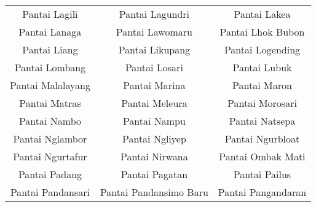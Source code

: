 \begin{table}[H]
\begin{tabular}{ c | c | c}
Pantai Lagili & Pantai Lagundri & Pantai Lakea\\
Pantai Lanaga & Pantai Lawomaru & Pantai Lhok Bubon\\
Pantai Liang & Pantai Likupang & Pantai Logending\\
Pantai Lombang & Pantai Losari & Pantai Lubuk\\
Pantai Malalayang & Pantai Marina & Pantai Maron\\
Pantai Matras & Pantai Meleura & Pantai Morosari\\
Pantai Nambo & Pantai Nampu & Pantai Natsepa\\
Pantai Nglambor & Pantai Ngliyep & Pantai Ngurbloat\\
Pantai Ngurtafur & Pantai Nirwana & Pantai Ombak Mati\\
Pantai Padang & Pantai Pagatan & Pantai Pailus\\
Pantai Pandansari & Pantai Pandansimo Baru & Pantai Pangandaran\\
	\end{tabular}	
\end{table}	
